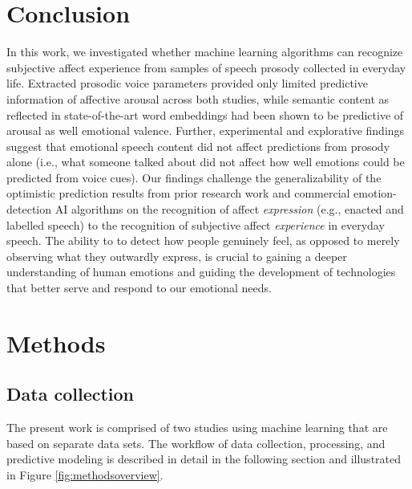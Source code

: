 \documentclass[
  english,
  man,floatsintext]{apa6}
\begin{document}
\hypertarget{conclusion}{%
\section{Conclusion}\label{conclusion}}

In this work, we investigated whether machine learning algorithms can recognize subjective affect experience from samples of speech prosody collected in everyday life. Extracted prosodic voice parameters provided only limited predictive information of affective arousal across both studies, while semantic content as reflected in state-of-the-art word embeddings had been shown to be predictive of arousal as well emotional valence. Further, experimental and explorative findings suggest that emotional speech content did not affect predictions from prosody alone (i.e., what someone talked about did not affect how well emotions could be predicted from voice cues). Our findings challenge the generalizability of the optimistic prediction results from prior research work and commercial emotion-detection AI algorithms on the recognition of affect \emph{expression} (e.g., enacted and labelled speech) to the recognition of subjective affect \emph{experience} in everyday speech. The ability to to detect how people genuinely feel, as opposed to merely observing what they outwardly express, is crucial to gaining a deeper understanding of human emotions and guiding the development of technologies that better serve and respond to our emotional needs.

\newpage

\hypertarget{methods}{%
\section{Methods}\label{methods}}

\hypertarget{data-collection}{%
\subsection{Data collection}\label{data-collection}}

The present work is comprised of two studies using machine learning that are based on separate data sets. The workflow of data collection, processing, and predictive modeling is described in detail in the following section and illustrated in Figure \ref{fig:methodsoverview}.
\end{document}

